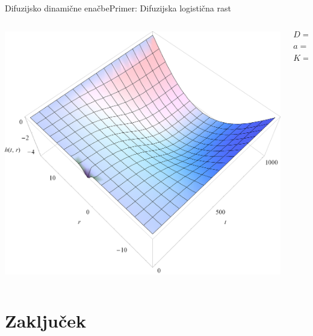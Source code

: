 \documentclass{beamer}
\begin{document}
\begin{frame}{Difuzijsko dinamične enačbe}{Primer: Difuzijska logistična rast}
\begin{columns}
  \begin{column}{0.8\textwidth}
    \includegraphics[width=1.05\textwidth]{slike/difuzija-logisticna-rast2.png}
  \end{column}
  \begin{column}{0.3\textwidth}
    \footnotesize
    \[ D = 1 \]
    \[ a = \frac{1}{50} \]
    \[ K = -10 \]
  \end{column}
\end{columns}
\end{frame}


\section*{Zaključek}
\end{document}
